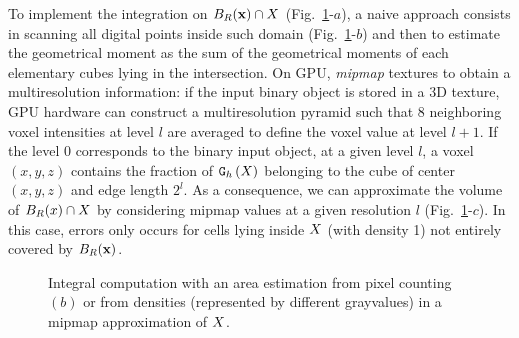 \documentclass{llncs}
\begin{document}
To implement the integration on $B_R(\mathbf{x})\cap X$
(Fig.~\ref{fig:approx}-$a$), a naive approach consists in scanning all
digital points inside such domain (Fig.~\ref{fig:approx}-$b$) and then
to estimate the geometrical moment as the sum of the geometrical
moments of each elementary cubes lying in the intersection. On GPU,
\emph{mipmap} textures to obtain a multiresolution information: if the
input binary object is stored in a 3D texture, GPU hardware can
construct a multiresolution pyramid such that 8 neighboring voxel
intensities at level $l$ are averaged to define the voxel value at
level $l+1$. If the level 0 corresponds to the binary input object, at
a given level $l$, a voxel $(x,y,z)$ contains the fraction of $\mathtt{G}_{h}\left(X\right)$
belonging to the cube of center $(x,y,z)$ and edge length $2^l$. As a
consequence, we can approximate the volume of $B_R(x)\cap X$ by
considering mipmap values at a given resolution $l$
(Fig.~\ref{fig:approx}-$c$). In this case, errors only occurs for
cells lying inside $X$ (with density 1) not entirely covered by
$B_R(\mathbf{x})$.
\begin{figure}
  \begin{center}
  \end{center}
  \caption{Integral computation with an area estimation from pixel
    counting $(b)$ or from densities (represented by different
    grayvalues) in a mipmap approximation of $X$.}
  \label{fig:approx}
\end{figure}
\end{document}
